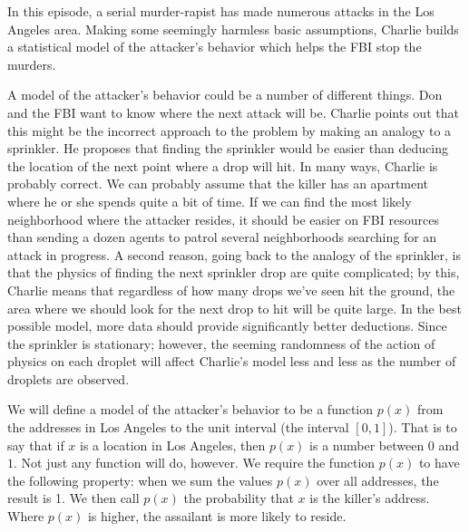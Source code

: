 \newpage
{}
{}

In this episode, a serial murder-rapist has made numerous attacks in the Los Angeles area. Making some seemingly harmless basic assumptions, Charlie builds a statistical model of the attacker's behavior which helps the FBI stop the murders.




A model of the attacker's behavior could be a number of different things. Don and the FBI want to know where the next attack will be. Charlie points out that this might be the incorrect approach to the problem by making an analogy to a sprinkler. He proposes that finding the sprinkler would be easier than deducing the location of the next point where a drop will hit. In many ways, Charlie is probably correct.  We can probably assume that the killer has an apartment where he or she spends quite a bit of time. If we can find the most likely neighborhood where the attacker resides, it should be easier on FBI resources than sending a dozen agents to patrol several neighborhoods searching for an attack in  progress. A second reason, going back to the analogy of the sprinkler, is that the physics of finding the next sprinkler drop are quite complicated; by this, Charlie means that regardless of how many drops we've seen hit the ground, the area where we should look for the next drop to hit will be quite large. In the best possible model, more data should provide significantly better deductions. Since the sprinkler is stationary; however, the seeming randomness of the action of physics on each droplet will affect Charlie's model less and less as the number of droplets are observed.


We will define a model of the attacker's behavior to be a function $p(x)$ from the addresses in Los Angeles to the unit interval (the interval $[0,1]$). That is to say that if $x$ is a location in Los Angeles, then $p(x)$ is a number between $0$ and $1$.  Not just any function will do, however. We require the function $p(x)$ to have the following property: when we sum the values $p(x)$ over all addresses, the result is 1. We then call $p(x)$ the probability that $x$ is the killer's address. Where $p(x)$ is higher, the assailant is more likely to reside.


